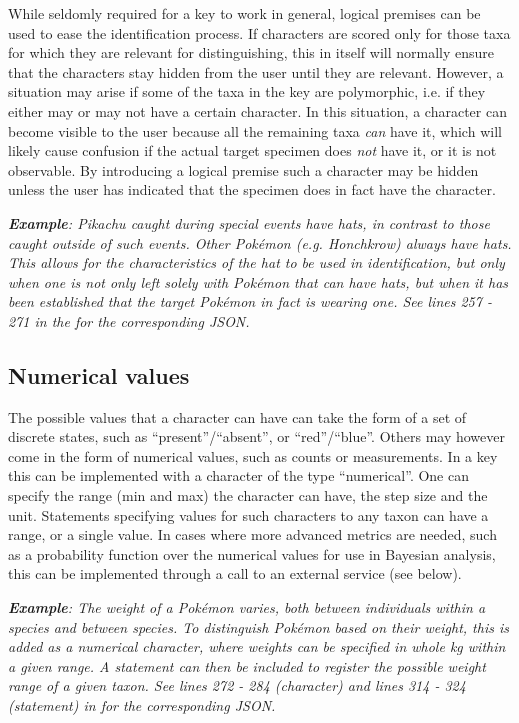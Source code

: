 \documentclass[10pt,letterpaper]{article}
\begin{document}
While seldomly required for a key to work in general, logical premises can be used to ease the identification process. If characters are scored only for those taxa for which they are relevant for distinguishing, this in itself will normally ensure that the characters stay hidden from the user until they are relevant. However, a situation may arise if some of the taxa in the key are polymorphic, i.e. if they either may or may not have a certain character. In this situation, a character can become visible to the user because all the remaining taxa \textit{can} have it, which will likely cause confusion if the actual target specimen does \textit{not} have it, or it is not observable. By introducing a logical premise such a character may be hidden unless the user has indicated that the specimen does in fact have the character.


\textit{\textbf{Example}: Pikachu caught during special events have hats, in contrast to those caught outside of such events. Other Pokémon (e.g. Honchkrow) always have hats. This allows for the characteristics of the hat to be used in identification, but only when one is not only left solely with Pokémon that can have hats, but when it has been established that the target Pokémon in fact is wearing one. See lines 257 - 271 in the  for the corresponding JSON.}
\subsection*{
Numerical values
}
The possible values that a character can have can take the form of a set of discrete states, such as ``present''/``absent'', or ``red''/``blue''. Others may however come in the form of numerical values, such as counts or measurements. In a key this can be implemented with a character of the type ``numerical''. One can specify the range (min and max) the character can have, the step size and the unit. Statements specifying values for such characters to any taxon can have a range, or a single value. In cases where more advanced metrics are needed, such as a probability function over the numerical values for use in Bayesian analysis, this can be implemented through a call to an external service (see below).



\textit{\textbf{Example}: The weight of a Pokémon varies, both between individuals within a species and between species. To distinguish Pokémon based on their weight, this is added as a numerical character, where weights can be specified in whole kg within a given range. A statement can then be included to register the possible weight range of a given taxon. See lines 272 - 284 (character) and lines 314 - 324 (statement) in  for the corresponding JSON.}
\end{document}
